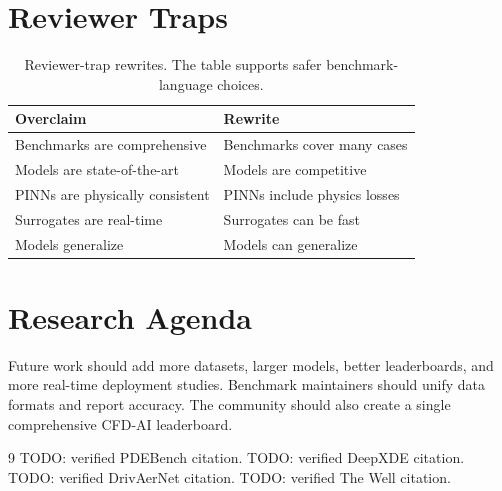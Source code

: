 \documentclass[11pt]{article}
\begin{document}
\vspace{1em}

\section{Reviewer Traps}
\begin{table}[h]
\centering
\begin{tabular}{ll}
\toprule
Overclaim & Rewrite \\
\midrule
Benchmarks are comprehensive & Benchmarks cover many cases \\
Models are state-of-the-art & Models are competitive \\
PINNs are physically consistent & PINNs include physics losses \\
Surrogates are real-time & Surrogates can be fast \\
Models generalize & Models can generalize \\
\bottomrule
\end{tabular}
\caption{Reviewer-trap rewrites. The table supports safer benchmark-language choices.}
\end{table}

\section{Research Agenda}
Future work should add more datasets, larger models, better leaderboards, and more real-time deployment studies. Benchmark maintainers should unify data formats and report accuracy. The community should also create a single comprehensive CFD-AI leaderboard.

\begin{thebibliography}{9}
 TODO: verified PDEBench citation.
 TODO: verified DeepXDE citation.
 TODO: verified DrivAerNet citation.
 TODO: verified The Well citation.
\end{thebibliography}
\end{document}
